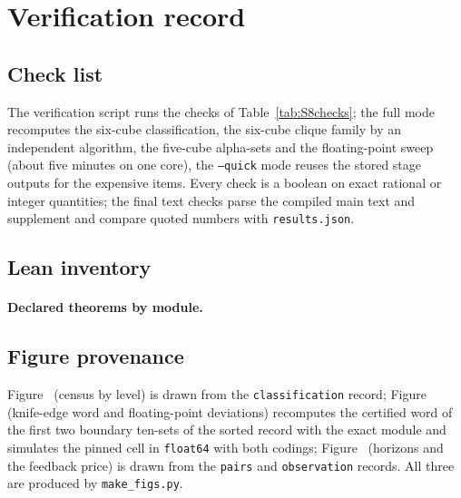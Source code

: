 \section{Verification record}\label{S:verif}

\subsection{Check list}
The verification script  runs the checks of Table~\ref{tab:S8checks}; the full mode recomputes the six-cube classification, the six-cube clique family by an independent algorithm, the five-cube alpha-sets and the floating-point sweep (about five minutes on one core), the \texttt{--quick} mode reuses the stored stage outputs for the expensive items. Every check is a boolean on exact rational or integer quantities; the final text checks parse the compiled main text and supplement and compare quoted numbers with \texttt{results.json}.
{\scriptsize

}

\subsection{Lean inventory}
\begin{table}[H]\centering\small
\caption{Lean modules: theorem declarations (including \texttt{@[simp]}-attributed ones) and \texttt{sorry} count; the modules declare no axioms.}\label{tab:S8lean}

\end{table}
\paragraph{Declared theorems by module.}


\subsection{Figure provenance}
Figure~ (census by level) is drawn from the \texttt{classification} record; Figure~ (knife-edge word and floating-point deviations) recomputes the certified word of the first two boundary ten-sets of the sorted record with the exact module and simulates the pinned cell in \texttt{float64} with both codings; Figure~ (horizons and the feedback price) is drawn from the \texttt{pairs} and \texttt{observation} records. All three are produced by \texttt{make\_figs.py}.
